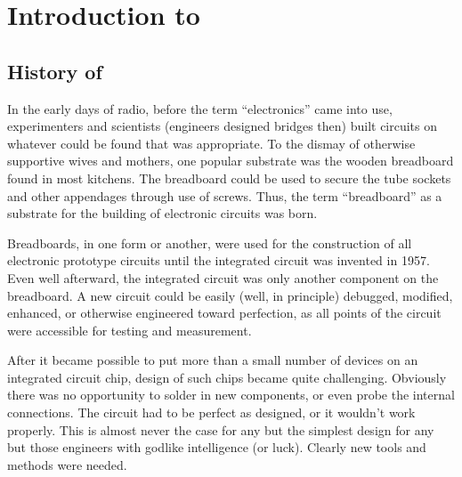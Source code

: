 
\chapter{Introduction to {\WRspice}}

\section{History of {\WRspice}}


In the early days of radio, before the term ``electronics'' came into
use, experimenters and scientists (engineers designed bridges then) built
circuits on whatever could be found that was appropriate.  To the
dismay of otherwise supportive wives and mothers, one popular
substrate was the wooden breadboard found in most kitchens.  The
breadboard could be used to secure the tube sockets and other
appendages through use of screws.  Thus, the term ``breadboard'' as a
substrate for the building of electronic circuits was born.

Breadboards, in one form or another, were used for the construction of
all electronic prototype circuits until the integrated circuit was
invented in 1957.  Even well afterward, the integrated circuit was
only another component on the breadboard.  A new circuit could be
easily (well, in principle) debugged, modified, enhanced, or otherwise
engineered toward perfection, as all points of the circuit were
accessible for testing and measurement.

After it became possible to put more than a small number of devices on
an integrated circuit chip, design of such chips became quite
challenging.  Obviously there was no opportunity to solder in new
components, or even probe the internal connections.  The circuit had
to be perfect as designed, or it wouldn't work properly.  This is
almost never the case for any but the simplest design for any but
those engineers with godlike intelligence (or luck).  Clearly new
tools and methods were needed.

